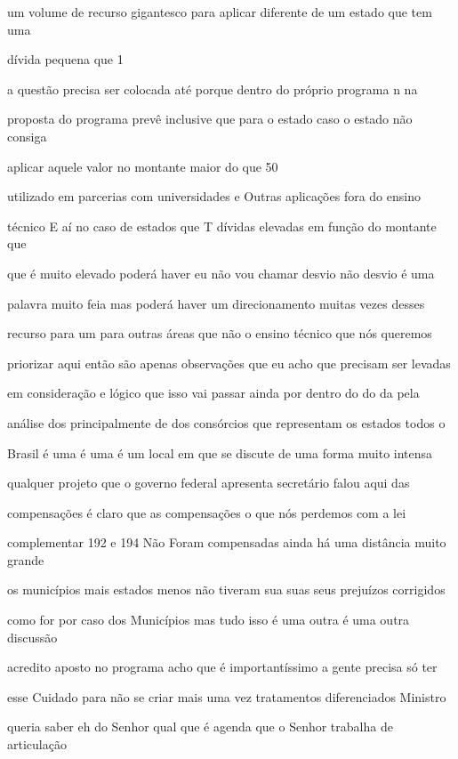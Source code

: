 \documentclass[a4paper,12pt]{article}
\begin{document}
um volume de recurso gigantesco para aplicar diferente de um estado que tem uma

dívida pequena que 1%

a questão precisa ser colocada até porque dentro do próprio programa n na

proposta do programa prevê inclusive que para o estado caso o estado não consiga

aplicar aquele valor no montante maior do que 50%

utilizado em parcerias com universidades e Outras aplicações fora do ensino

técnico E aí no caso de estados que T dívidas elevadas em função do montante que

que é muito elevado poderá haver eu não vou chamar desvio não desvio é uma

palavra muito feia mas poderá haver um direcionamento muitas vezes desses

recurso para um para outras áreas que não o ensino técnico que nós queremos

priorizar aqui então são apenas observações que eu acho que precisam ser levadas

em consideração e lógico que isso vai passar ainda por dentro do do da pela

análise dos principalmente de dos consórcios que representam os estados todos o

Brasil é uma é uma é um local em que se discute de uma forma muito intensa

qualquer projeto que o governo federal apresenta secretário falou aqui das

compensações é claro que as compensações o que nós perdemos com a lei

complementar 192 e 194 Não Foram compensadas ainda há uma distância muito grande

os municípios mais estados menos não tiveram sua suas seus prejuízos corrigidos

como for por caso dos Municípios mas tudo isso é uma outra é uma outra discussão

acredito aposto no programa acho que é importantíssimo a gente precisa só ter

esse Cuidado para não se criar mais uma vez tratamentos diferenciados Ministro

queria saber eh do Senhor qual que é agenda que o Senhor trabalha de articulação
\end{document}
